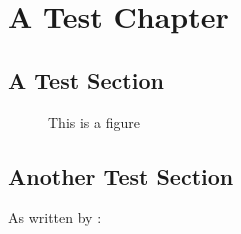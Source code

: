 \newcommand{\thetitle}{The Great Project\\ And How to Typeset it}
\newcommand{\thegroup}{Group XXXX}
\newcommand{\theauthors}{
	Anders Andersen\\
	Anders Andersen\\
	Anders Andersen\\
	Anders Andersen
}
\newcommand{\thesupervisor}{Your Supervisor}
\newcommand{\thestudy}{Your Study}
\newcommand{\thetheme}{Your Theme}
\newcommand{\theprojectperiod}{Spring / Summer}
\newcommand{\deadline}{\today}





\chapter{A Test Chapter}
\lipsum[1]

\section{A Test Section}
\lipsum[2] \autocite{goossens93}

\lipsum[3]
\begin{figure}[h]
	\centering
	\caption{This is a figure}
\end{figure}

\section{Another Test Section}
\lipsum[4]

As written by \textcite{greenwade93}:
\lipsum[5] 

\printbibliography[
	heading=bibintoc         %
	,title={Litteraturliste}%
]

\listoffigures

